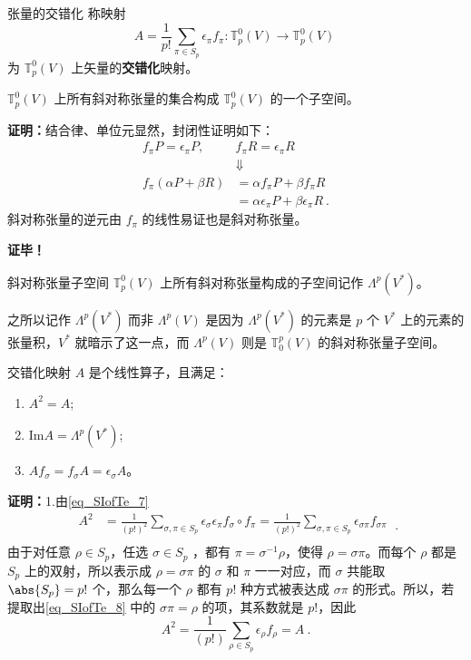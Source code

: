 \begin{definition}{张量的交错化}\label{def_SIofTe_1}
称映射
\begin{equation}\label{eq_SIofTe_7}
A=\frac{1}{p!}\sum_{\pi\in S_p}\epsilon_\pi f_\pi:\mathbb{T}_p^0(V)\rightarrow\mathbb{T}_p^0(V)~
\end{equation}
为 $\mathbb{T}_p^0(V)$ 上矢量的\textbf{交错化}映射。
\end{definition}
\begin{theorem}{}
$\mathbb{T}_p^0(V)$ 上所有斜对称张量的集合构成 $\mathbb{T}_p^0(V)$ 的一个子空间。
\end{theorem}
\textbf{证明：}结合律、单位元显然，封闭性证明如下：
\begin{equation}
\begin{aligned}
f_\pi P=\epsilon_\pi P,\quad&f_\pi R=\epsilon_\pi R\\
&\Downarrow\\
f_\pi(\alpha P+\beta R)&=\alpha f_\pi P+\beta f_\pi R\\
&=\alpha \epsilon_\pi P+\beta \epsilon_\pi R~.
\end{aligned}
\end{equation}
斜对称张量的逆元由 $f_\pi$ 的线性易证也是斜对称张量。

\textbf{证毕！}
\begin{definition}{斜对称张量子空间}
$\mathbb{T}_p^0(V)$ 上所有斜对称张量构成的子空间记作 $\Lambda^p(V^*)$。
\end{definition}
之所以记作  $\Lambda^p(V^*)$ 而非  $\Lambda^p(V)$ 是因为  $\Lambda^p(V^*)$ 的元素是 $p$ 个 $V^*$ 上的元素的张量积，$V^*$ 就暗示了这一点，而 $\Lambda^p(V)$ 则是 $\mathbb{T}_0^p(V)$ 的斜对称张量子空间。

\begin{theorem}{}\label{the_SIofTe_1}
交错化映射 $A$ 是个线性算子，且满足：
\begin{enumerate}
\item $A^2=A$;
\item $\mathrm{Im} A=\Lambda^p(V^*)$;
\item $Af_\sigma=f_\sigma A=\epsilon_\sigma A$。
\end{enumerate}
\end{theorem}
\textbf{证明：}1.由\autoref{eq_SIofTe_7} 
\begin{equation}\label{eq_SIofTe_8}
\begin{aligned}
A^2&=\frac{1}{(p!)^2}\sum_{\sigma,\pi\in S_p}\epsilon_\sigma\epsilon_\pi f_\sigma\circ f_\pi=\frac{1}{(p!)^2}\sum_{\sigma,\pi\in S_p}\epsilon_{\sigma\pi} f_{\sigma\pi}\\
\end{aligned}~.
\end{equation}
由于对任意 $\rho\in S_p$，任选 $\sigma\in S_p$ ，都有 $\pi=\sigma^{-1}\rho$，使得 $\rho=\sigma\pi$。而每个 $\rho$ 都是 $S_p$ 上的双射，所以表示成 $\rho=\sigma\pi$ 的 $\sigma$ 和 $\pi$ 一一对应，而 $\sigma$ 共能取 $\abs{S_p}=p!$ 个，那么每一个 $\rho$ 都有 $p!$ 种方式被表达成 $\sigma \pi$ 的形式。所以，若提取出\autoref{eq_SIofTe_8} 中的 $\sigma\pi=\rho$ 的项，其系数就是 $p!$，因此
\begin{equation}
A^2=\frac{1}{(p!)}\sum_{\rho\in S_p}\epsilon_\rho f_\rho=A~.
\end{equation}

